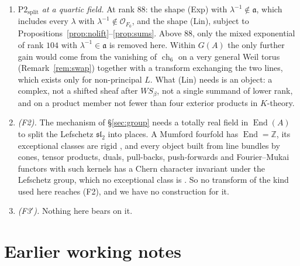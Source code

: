 \documentclass[11pt]{amsart}
\theoremstyle{definition}
\theoremstyle{remark}
\newcommand{\ZZ}{\mathbb{Z}}
\newcommand{\cO}{\mathcal{O}}
\newcommand{\fa}{\mathfrak{a}}
\newcommand{\ch}{\operatorname{ch}}
\newcommand{\End}{\operatorname{End}}
\begin{document}
\begin{enumerate}[label=(\alph*),leftmargin=2.2em,itemsep=2pt]
\item \emph{$\mathrm{P2}_{\mathrm{split}}$ at a quartic field.} At rank $88$:
  the shape (Exp) with $\lambda^{-1}\notin\fa$, which includes every
  $\lambda$ with $\lambda^{-1}\notin\cO_{F_{0}}$, and the shape (Lin),
  subject to Propositions~\ref{prop:nolift}--\ref{prop:sums}. Above $88$,
  only the mixed exponential of rank $104$ with $\lambda^{-1}\in\fa$ is removed
  here. Within $G(A)$ the only further gain would come from the vanishing of
  $\ch_{6}$ on a very general Weil torus
  (Remark~\ref{rem:swap}) together with a transform exchanging the two lines,
  which exists only for non-principal $L$. What (Lin) needs is an object: a complex, not a
  shifted sheaf after $WS_{\beta}$, not a single summand of lower rank, and on
  a product member not fewer than four exterior products in $K$-theory.
\item \emph{(F2).} The mechanism of \S\ref{sec:group} needs a totally real
  field in $\End(A)$ to split the Lefschetz $\mathfrak{sl}_{2}$ into places. A
  Mumford fourfold has $\End=\ZZ$, its exceptional classes are rigid
  \cite[Theorem~21.21]{BMB}, and every object built from line bundles by
  cones, tensor products, duals, pull-backs, push-forwards and Fourier--Mukai
  functors with such kernels has a Chern character invariant under the
  Lefschetz group, which no exceptional class is
  \cite[Theorem~21.36]{BMB}. So no transform of the kind used here reaches
  (F2), and we have no construction for it.
\item \emph{(F3$'$).} Nothing here bears on it.
\end{enumerate}

\section{Earlier working notes}\label{sec:prior}
\end{document}
